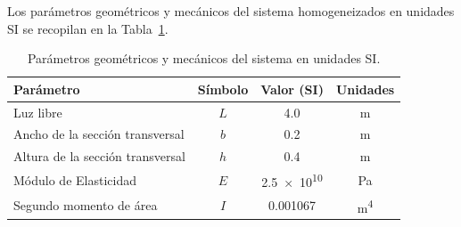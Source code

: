 \documentclass[10pt,letterpaper]{article}
\begin{document}
\begin{table}[h!]
\centering
\caption{Resumen de conversión de unidades de ingeniería a unidades del Sistema Internacional (SI).}
\label{tab:unidades}
\setlength{\tabcolsep}{4pt}
\end{table}

Los parámetros geométricos y mecánicos del sistema homogeneizados en unidades SI se recopilan en la Tabla~\ref{tab:parametros}.

\begin{table}[h!]
\centering
\caption{Parámetros geométricos y mecánicos del sistema en unidades SI.}
\label{tab:parametros}
\begin{tabular}{lccc}
\toprule
\textbf{Parámetro} & \textbf{Símbolo} & \textbf{Valor (SI)} & \textbf{Unidades} \\
\midrule
Luz libre & $L$ & \num{4.0} & \si{\meter} \\
Ancho de la sección transversal & $b$ & \num{0.2} & \si{\meter} \\
Altura de la sección transversal & $h$ & \num{0.4} & \si{\meter} \\
Módulo de Elasticidad & $E$ & \num{2.5e10} & \si{\pascal} \\
Segundo momento de área & $I$ & \num{0.001067} & \si{\meter^4} \\
\bottomrule
\end{tabular}
\end{table}
\end{document}
